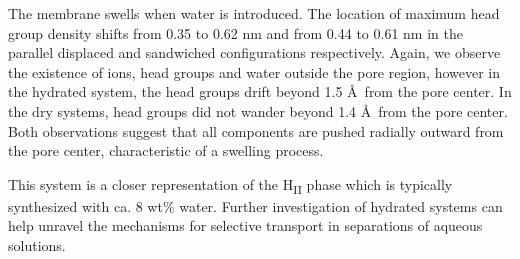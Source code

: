 \documentclass{article}
\begin{document}
  The membrane swells when water is introduced. The location of maximum head
  group density shifts from 0.35 to 0.62 nm and from 0.44 to 0.61 nm in the
  parallel displaced and sandwiched configurations respectively. Again, we observe the
  existence of ions, head groups and water outside the pore region, however in the
  hydrated system, the head groups drift beyond 1.5 \AA~from the pore center. In
  the dry systems, head groups did not wander beyond 1.4 \AA~from the pore
  center. Both observations suggest that all components are pushed radially
  outward from the pore center, characteristic of a swelling process. 
   
  This system is a closer representation of the H\textsubscript{II} phase which
  is typically synthesized with ca. 8 wt\% water. Further investigation of
  hydrated systems can help unravel the mechanisms for selective transport in
  separations of aqueous solutions. 
\end{document}
